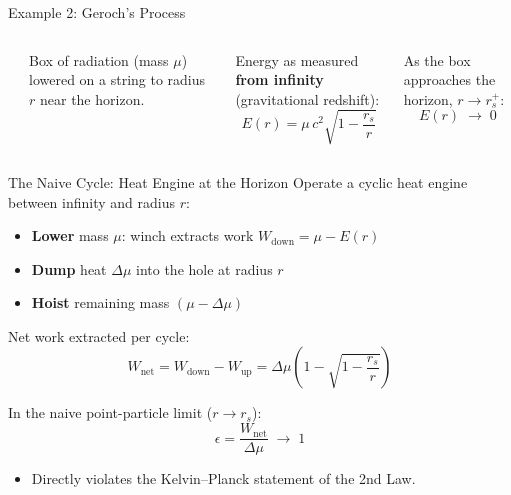 \documentclass[aspectratio=169]{beamer}
\begin{document}
\begin{frame}{Example 2: Geroch's Process}
\begin{columns}[c]
\begin{center}
\end{center}

Box of radiation (mass $\mu$) lowered on a string to radius $r$ near the horizon.

\vspace{0.3cm}
Energy as measured \textbf{from infinity} (gravitational redshift):
\[
E(r) = \mu\,c^2\sqrt{1-\dfrac{r_s}{r}}
\]

\vspace{0.3cm}
As the box approaches the horizon, $r\to r_s^+$:
\[
\boxed{E(r)\;\longrightarrow\;0}
\]
\end{columns}
\end{frame}

\begin{frame}{The Naive Cycle: Heat Engine at the Horizon}
Operate a cyclic heat engine between infinity and radius $r$:
\begin{itemize}
    \item \textbf{Lower} mass $\mu$: winch extracts work $W_{\text{down}} = \mu - E(r)$
    \item \textbf{Dump} heat $\Delta\mu$ into the hole at radius $r$
    \item \textbf{Hoist} remaining mass $(\mu - \Delta\mu)$
\end{itemize}

\vspace{0.3cm}
Net work extracted per cycle:
\[
W_{\text{net}} = W_{\text{down}} - W_{\text{up}} = \Delta\mu \left(1 - \sqrt{1 - \frac{r_s}{r}}\right)
\]

\vspace{0.3cm}
In the naive point-particle limit ($r \to r_s$):
\[
\boxed{\epsilon = \frac{W_{\text{net}}}{\Delta\mu} \;\longrightarrow\; 1}
\]
\begin{itemize}
    \item Directly violates the Kelvin--Planck statement of the 2nd Law.
\end{itemize}
\end{frame}
\end{document}
